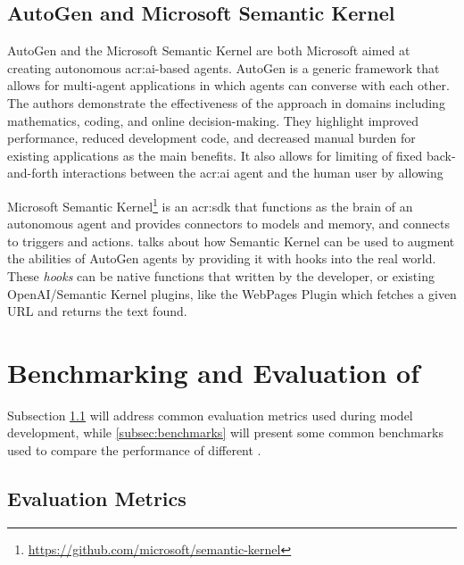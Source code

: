 \subsection{AutoGen and Microsoft Semantic Kernel}\label{subsubsec:microsoft-semantic-kernel}

AutoGen and the Microsoft Semantic Kernel are both Microsoft aimed at creating autonomous \acrshort{acr:ai}-based agents. AutoGen \cite{wuAutoGenEnablingNextGen2023} is a generic framework that allows for multi-agent applications in which agents can converse with each other. The authors demonstrate the effectiveness of the approach in domains including mathematics, coding, and online decision-making. They highlight improved performance, reduced development code, and decreased manual burden for existing applications as the main benefits. It also allows for limiting of fixed back-and-forth interactions between the \acrshort{acr:ai} agent and the human user by allowing

Microsoft Semantic Kernel\footnote{\url{https://github.com/microsoft/semantic-kernel}} is an \acrshort{acr:sdk} that functions as the brain of an autonomous agent and provides connectors to models and memory, and connects to triggers and actions. \cite{maedaAutoGenAgentsMeet2023} talks about how Semantic Kernel can be used to augment the abilities of AutoGen agents by providing it with hooks into the real world. These \textit{hooks} can be native functions that written by the developer, or existing OpenAI/Semantic Kernel plugins, like the WebPages Plugin which fetches a given URL and returns the text found.



\section[Benchmarking and Evaluation of LLMs]{Benchmarking and Evaluation of }\label{sec:benchmarking-and-evaluation}

Subsection \ref{subsec:evaluation-metrics} will address common evaluation metrics used during model development, while \autoref{subsec:benchmarks} will present some common benchmarks used to compare the performance of different .

\subsection{Evaluation Metrics}\label{subsec:evaluation-metrics}

